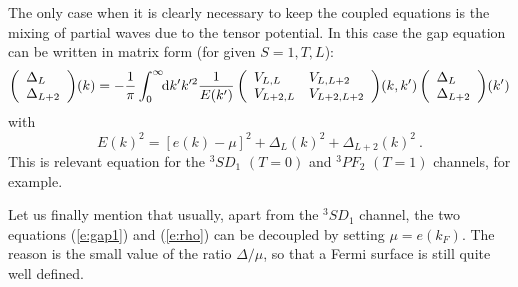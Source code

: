 \documentclass[runningheads]{svmult}
\newcommand{\be}{\begin{equation}}
\newcommand{\ee}{\end{equation}}
\def\de{\Delta}
\def\sd{^3\!S\!D_1}
\def\pf{^3\!P\!F_2}
\begin{document}
The only case when it is clearly necessary to keep the coupled equations
is the mixing of partial waves due to the tensor potential.
In this case the gap equation can be written in matrix form 
(for given $S=1,T,L$):
\be
 \left( \begin{array}{l} \Delta_L \\ \Delta_{L+2} \end{array} \right)\!(k) =
 - {1\over\pi} \int_0^\infty \!\!\D k' k'^2 {1\over E(k')}
 \left( \begin{array}{ll}
  V_{L,L} & V_{L,L+2} \\ V_{L+2,L} & V_{L+2,L+2}
 \end{array} \right)\!(k,k')
 \left(\begin{array}{l} \Delta_L \\ \Delta_{L+2} \end{array}\right)\!(k') 
\ee
with 
\be
 E(k)^2 = [e(k)-\mu]^2 + \Delta_L(k)^2 + \Delta_{L+2}(k)^2 \:.
\ee
This is relevant equation for the $\sd$ $(T=0)$ and $\pf$ $(T=1)$ 
channels, for example.

Let us finally mention that usually, apart from the $\sd$ channel,
the two equations (\ref{e:gap1}) and (\ref{e:rho}) can be decoupled 
by setting $\mu=e(k_F)$. 
The reason is the small value of the ratio $\de/\mu$,
so that a Fermi surface is still quite well defined.
\end{document}
